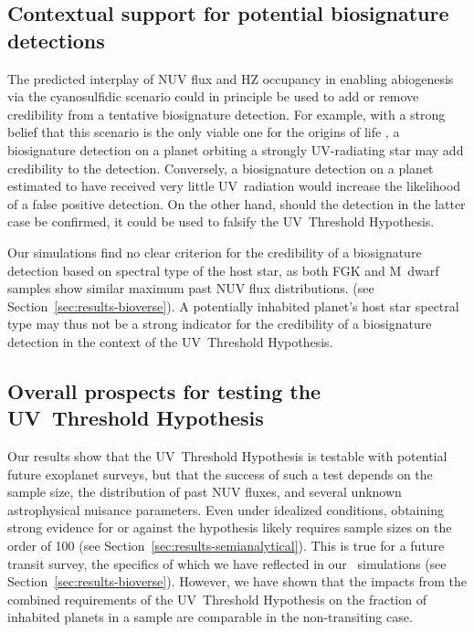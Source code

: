 \documentclass[twocolumn,twocolappendix,linenumbers]{aastex631}
\begin{document}
\subsection{Contextual support for potential biosignature detections} %
The predicted interplay of \gls{NUV} flux and \gls{HZ} occupancy in enabling abiogenesis via the cyanosulfidic scenario could in principle be used to add or remove credibility from a tentative biosignature detection.
For example, with a strong  belief that this scenario is the only viable one for the origins of life , a biosignature detection on a planet orbiting a strongly UV-radiating star may add credibility to the detection.
Conversely, a biosignature detection on a planet estimated to have received very little UV~radiation would increase the likelihood of a false positive detection.
On the other hand, should the detection in the latter case be confirmed, it could be used to falsify the UV~Threshold Hypothesis.

Our simulations find no clear criterion for the credibility of a biosignature detection based on spectral type of the host star, as both FGK and M~dwarf samples show similar maximum past \gls{NUV} flux distributions.
(see Section~\ref{sec:results-bioverse}).
A potentially inhabited planet's host star spectral type may thus not be a strong indicator for the credibility of a biosignature detection in the context of the UV~Threshold Hypothesis.

\subsection{Overall prospects for testing the UV~Threshold Hypothesis} %
Our results show that the UV~Threshold Hypothesis is testable with potential future exoplanet surveys, but that the success of such a test depends on the sample size, the distribution of past \gls{NUV} fluxes, and several unknown astrophysical nuisance parameters.
Even under idealized conditions, obtaining strong evidence for or against the hypothesis likely requires sample sizes on the order of 100 (see Section~\ref{sec:results-semianalytical}).
This is true for a future transit survey, the specifics of which we have reflected in our \bioverse\ simulations (see Section~\ref{sec:results-bioverse}).
However, we have shown that the impacts from the combined requirements of the UV~Threshold Hypothesis on the fraction of inhabited planets in a sample are comparable in the non-transiting case.
\end{document}
